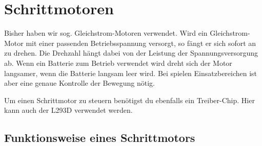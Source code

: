 \section{Schrittmotoren} 


Bisher haben wir sog. Gleichstrom-Motoren verwendet. Wird  ein Gleichstrom-Motor mit einer passenden Betriebsspannung versorgt, so fängt er sich sofort an zu drehen. Die Drehzahl hängt dabei von der Leistung der Spannungsversorgung ab. Wenn ein Batterie zum Betrieb verwendet wird dreht sich der Motor langsamer, wenn die Batterie langsam leer wird. Bei spielen Einsatzbereichen ist aber eine genaue Kontrolle der Bewegung nötig.     


Um einen Schrittmotor zu steuern benötigst du ebenfalls  ein Treiber-Chip. Hier kann auch der L293D verwendet werden.

\subsection{Funktionsweise eines Schrittmotors}


